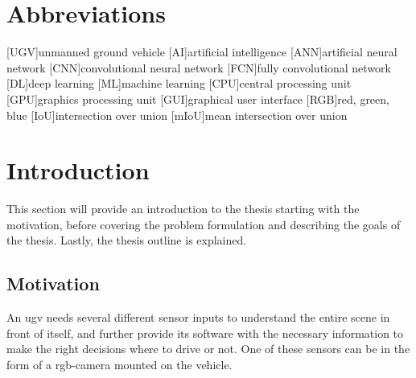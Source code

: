 \documentclass[USenglish]{ifimaster}  %
\begin{document}
\chapter*{Abbreviations}
\begin{acronym}
        [UGV]{unmanned ground vehicle}
        [AI]{artificial intelligence}
        [ANN]{artificial neural network}
        [CNN]{convolutional neural network}
        [FCN]{fully convolutional network}
        [DL]{deep learning}
        [ML]{machine learning}
        [CPU]{central processing unit}
        [GPU]{graphics processing unit}
        [GUI]{graphical user interface}
        [RGB]{red, green, blue}
        [IoU]{intersection over union}
        [mIoU]{mean intersection over union}
\end{acronym}


\mainmatter{}
\chapter{Introduction}
This section will provide an introduction to the thesis starting with the motivation, before covering the problem formulation and describing the goals of the thesis. Lastly, the thesis outline is explained. 
\section{Motivation}
An \ac{ugv} needs several different sensor inputs to understand the entire scene in front of itself, and further provide its software with the necessary information to make the right decisions where to drive or not. One of these sensors can be in the form of a \ac{rgb}-camera mounted on the vehicle.
\end{document}

